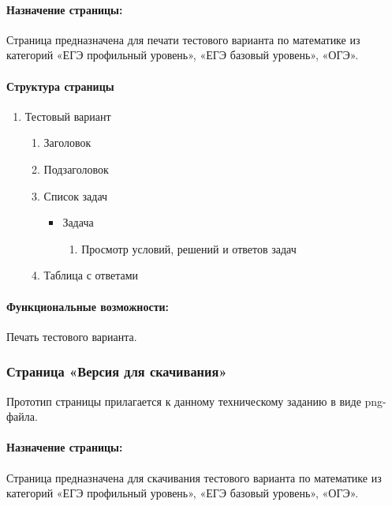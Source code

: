 \paragraph{Назначение страницы:} Страница предназначена для печати тестового варианта по математике из категорий «ЕГЭ профильный уровень», «ЕГЭ базовый уровень», «ОГЭ».

\paragraph{Структура страницы}
\begin{enumerate}
	\item Тестовый вариант
	\begin{enumerate}
		\item Заголовок
		\item Подзаголовок
		\item Список задач
		\begin{itemize}
		\item Задача
		\begin{enumerate}
			\item Просмотр условий, решений и ответов задач
		\end{enumerate}
		\end{itemize}
		\item Таблица с ответами
	\end{enumerate}
\end{enumerate}

\paragraph{Функциональные возможности:} Печать тестового варианта.


\subsubsection{Страница «Версия для скачивания»}

Прототип страницы прилагается к данному техническому заданию в виде png-файла.

\paragraph{Назначение страницы:} Страница предназначена для скачивания тестового варианта по математике из категорий «ЕГЭ профильный уровень», «ЕГЭ базовый уровень», «ОГЭ».

